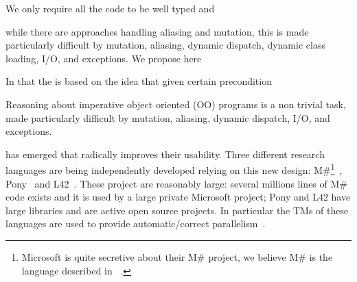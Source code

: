 \LINE


We only require all the code to be well typed and 


 while 
there are approaches handling aliasing and mutation,
this is made particularly difficult by mutation, aliasing, dynamic dispatch, dynamic class loading,
I/O, and exceptions.
We propose here 

In
that the 
is based on the idea that 
given certain precondition










\newpage
Reasoning about imperative object oriented (OO) programs is a non trivial task,
made particularly difficult by mutation, aliasing, dynamic dispatch, I/O, and exceptions. 

 has emerged that radically improves their usability.
Three different research languages are being independently developed relying on this new design: {M\#}\footnote{Microsoft is quite secretive about their M\# project, we believe M\# is the language described in ~\cite{?}.}~\cite{?}, Pony~\cite{?} and L42~\cite{?}.
These project are reasonably large: several millions lines of M\# code exists and it is used by a large private Microsoft project; Pony and L42 have large libraries and are active open source projects. In particular the TMs of these languages are used to provide automatic/correct parallelism~\cite{GordonEtAl12,clebsch2015deny,clebsch2017orca,?}.



